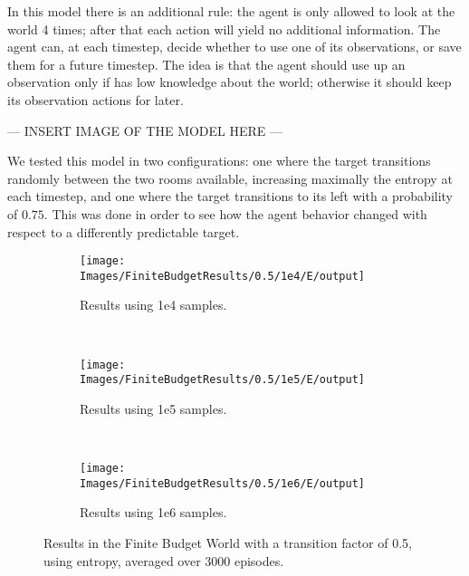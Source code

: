 In this model there is an additional rule: the agent is only allowed to look at the world 4 times;
after that each action will yield no additional information. The agent can, at each timestep, decide
whether to use one of its observations, or save them for a future timestep. The idea is that
the agent should use up an observation only if has low knowledge about the world; otherwise it
should keep its observation actions for later.


--- INSERT IMAGE OF THE MODEL HERE ---

We tested this model in two configurations: one where the target transitions randomly between the
two rooms available, increasing maximally the entropy at each timestep, and one where the target
transitions to its left with a probability of $0.75$. This was done in order to see how the agent behavior
changed with respect to a differently predictable target.

\begin{figure}[ht]
        \centering
        \begin{subfigure}[t]{0.3\textwidth}
                \texttt{[image: Images/FiniteBudgetResults/0.5/1e4/E/output]}
                \caption{Results using 1e4 samples.}
                \label{fig:fb4e5}
        \end{subfigure}%
        ~ %
        \begin{subfigure}[t]{0.3\textwidth}
                \texttt{[image: Images/FiniteBudgetResults/0.5/1e5/E/output]}
                \caption{Results using 1e5 samples.}
                \label{fig:fb5e5}
        \end{subfigure}
        ~ %
        \begin{subfigure}[t]{0.3\textwidth}
                \texttt{[image: Images/FiniteBudgetResults/0.5/1e6/E/output]}
                \caption{Results using 1e6 samples.}
                \label{fig:fb6e5}
        \end{subfigure}
        \caption{Results in the Finite Budget World with a transition factor of 0.5, using entropy, averaged over 3000 episodes.}
        \label{ref:fbentropyfig5}
\end{figure}

